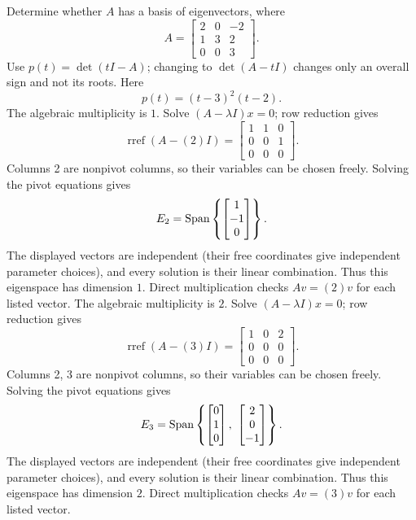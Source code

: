 \goal Determine whether $A$ has a basis of eigenvectors, where
\[A=\begin{bmatrix}2&0&-2\\1&3&2\\0&0&3\end{bmatrix}.\]
Use $p(t)=\det(tI-A)$; changing to $\det(A-tI)$ changes only an overall sign and not its roots. Here
\[p(t)=\left(t - 3\right)^{2} \left(t - 2\right).\]
The algebraic multiplicity is $1$. Solve $(A-\lambda I)x=0$; row reduction gives
\[\operatorname{rref}(A-(2)I)=\begin{bmatrix}1&1&0\\0&0&1\\0&0&0\end{bmatrix}.\]
Columns 2 are nonpivot columns, so their variables can be chosen freely. Solving the pivot equations gives
\[E_{2}=\operatorname{Span}\left\{\begin{bmatrix}1\\-1\\0\end{bmatrix}\right\}.\]
The displayed vectors are independent (their free coordinates give independent parameter choices), and every solution is their linear combination. Thus this eigenspace has dimension $1$. Direct multiplication checks $Av=(2)v$ for each listed vector.
The algebraic multiplicity is $2$. Solve $(A-\lambda I)x=0$; row reduction gives
\[\operatorname{rref}(A-(3)I)=\begin{bmatrix}1&0&2\\0&0&0\\0&0&0\end{bmatrix}.\]
Columns 2, 3 are nonpivot columns, so their variables can be chosen freely. Solving the pivot equations gives
\[E_{3}=\Span\left\{\begin{bmatrix}0\\1\\0\end{bmatrix},\ \begin{bmatrix}2\\0\\-1\end{bmatrix}\right\}.\]
The displayed vectors are independent (their free coordinates give independent parameter choices), and every solution is their linear combination. Thus this eigenspace has dimension $2$. Direct multiplication checks $Av=(3)v$ for each listed vector.

